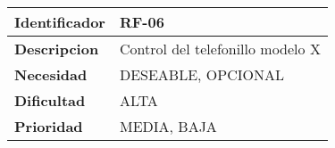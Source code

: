 \begin{center}
    \begin{tabular}{|p{2.6cm}|p{12cm}|}
    \hline
    \textbf{Identificador} & RF-06\\
    \hline
    \textbf{Descripcion} & Control del telefonillo modelo X\\
    \hline
    \textbf{Necesidad} & DESEABLE, OPCIONAL\\
    \hline
    \textbf{Dificultad} & ALTA\\
    \hline
    \textbf{Prioridad} & MEDIA, BAJA\\
    \hline
    \end{tabular}
\end{center}
